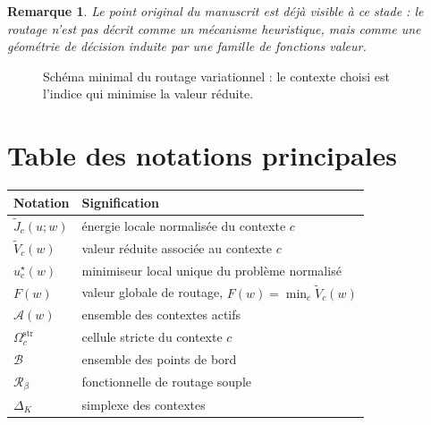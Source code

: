 \documentclass[11pt,a4paper]{article}
\newtheorem{remark}{Remarque}[section]
\DeclareMathOperator{\argmin}{argmin}
\newcommand{\R}{\mathbb R}
\newcommand{\Ccal}{\mathcal C}
\newcommand{\Rcal}{\mathcal R}
\newcommand{\Acal}{\mathcal A}
\newcommand{\Bcal}{\mathcal B}
\begin{document}
\begin{remark}
Le point original du manuscrit est déjà visible à ce stade : le routage n'est pas décrit comme un mécanisme heuristique, mais comme une géométrie de décision induite par une famille de fonctions valeur.
\end{remark}

\begin{figure}[ht]
\centering
{}
\caption{Schéma minimal du routage variationnel : le contexte choisi est l'indice qui minimise la valeur réduite.}
\end{figure}

\section*{Table des notations principales}
\begin{center}
\begin{tabular}{@{}ll@{}}
\toprule
Notation & Signification \\ \midrule
\(\widetilde J_c(u;w)\) & énergie locale normalisée du contexte \(c\) \\
\(\widetilde V_c(w)\) & valeur réduite associée au contexte \(c\) \\
\(u_c^\star(w)\) & minimiseur local unique du problème normalisé \\
\(F(w)\) & valeur globale de routage, \(F(w)=\min_c \widetilde V_c(w)\) \\
\(\Acal(w)\) & ensemble des contextes actifs \\
\(\Omega_c^{\mathrm{str}}\) & cellule stricte du contexte \(c\) \\
\(\Bcal\) & ensemble des points de bord \\
\(\Rcal_\beta\) & fonctionnelle de routage souple \\
\(\Delta_K\) & simplexe des contextes \\ \bottomrule
\end{tabular}
\end{center}
\end{document}
